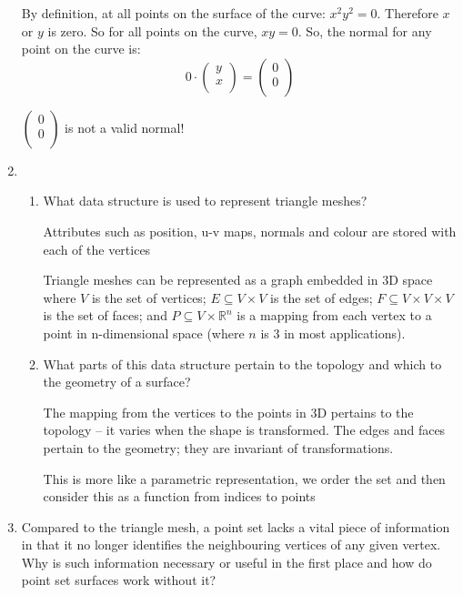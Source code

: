 \documentclass[10pt,\jkfside,a4paper]{article}
\begin{document}
\begin{enumerate}
By definition, at all points on the surface of the curve: $x^2 y^2 = 0$.
Therefore $x$ or $y$ is zero. So for all points on the curve, $xy = 0$. So,
the normal for any point on the curve is:
\[
0\cdot
\begin{pmatrix}
y\\
x\\
\end{pmatrix}
= \begin{pmatrix}
0\\
0\\
\end{pmatrix}
\]

$ \begin{pmatrix}
0\\0\\
\end{pmatrix} $ is not a valid normal!

\item

\begin{enumerate}

\item What data structure is used to represent triangle meshes?

{\color{blue} Attributes such as position, u-v maps, normals and colour are
stored with each of the vertices}

Triangle meshes can be represented as a graph embedded in 3D space where $V$
is the set of vertices; $E \subseteq V \times V$ is the set of edges; $F
\subseteq V \times V \times V$ is the set of faces; and $P \subseteq V \times
\mathbb{R}^n$ is a mapping from each vertex to a point in n-dimensional
space (where $n$ is 3 in most applications).

\item What parts of this data structure pertain to the topology and which to
the geometry of a surface?

The mapping from the vertices to the points in 3D pertains to the topology
-- it varies when the shape is transformed. The edges and faces
pertain to the geometry; they are invariant of transformations.

{\color{blue} This is more like a parametric representation, we order the set
and then consider this as a function from indices to points}

\end{enumerate}

\item Compared to the triangle mesh, a point set lacks a vital piece of
information in that it no longer identifies the neighbouring vertices of any
given vertex. Why is such information necessary or useful in the first place
and how do point set surfaces work without it?


\end{enumerate}
\end{document}
